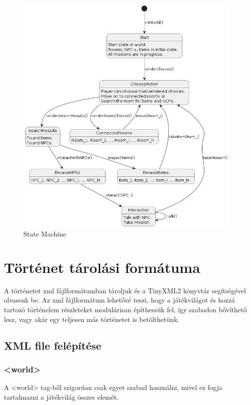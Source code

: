 \documentclass{scrarticle}
\begin{document}
\begin{figure}[H]
    \includegraphics[width=1.0\columnwidth]{State_Machine.png}
    \caption{State Machine}\label{fig:5}
\end{figure}

\section{Történet tárolási formátuma}
A történetet xml fájlformátumban tároljuk és a TinyXML2 könyvtár segítségével olvassuk be. Az xml fájlformátum lehetővé teszi, hogy a játékvilágot és hozzá tartozó történelem részleteket modulárisan építhessük fel, így szabadon bővíthető lesz, vagy akár egy teljesen más történetet is betölthetünk.

\subsection{XML file felépítése}

\subsubsection{<world>}
A <world> tag-ből szigorúan csak egyet szabad használni, mivel ez fogja tartalmazni a játékvilág összes elemét.
\end{document}
